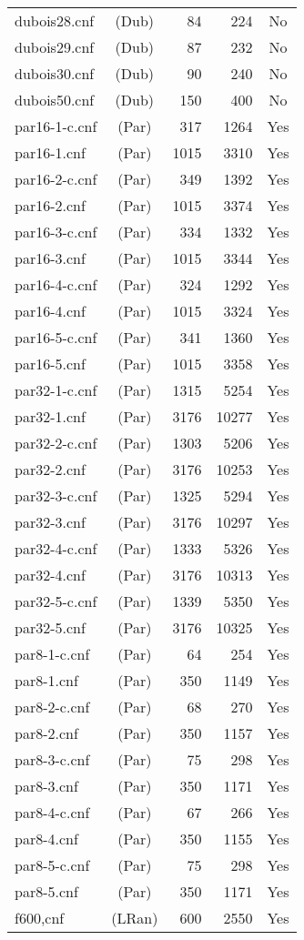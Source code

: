 \begin{supertabular}{|lc|rr|c|}
dubois28.cnf&(Dub)&84&224&No\\
dubois29.cnf&(Dub)&87&232&No\\
dubois30.cnf&(Dub)&90&240&No\\
dubois50.cnf&(Dub)&150&400&No\\
par16-1-c.cnf&(Par)&317 &1264 &Yes\\
par16-1.cnf&(Par)&1015 &3310 &Yes\\ 
par16-2-c.cnf&(Par)&349 &1392 &Yes\\
par16-2.cnf&(Par)&1015 &3374 &Yes\\ 
par16-3-c.cnf&(Par)&334 &1332 &Yes\\
par16-3.cnf&(Par)&1015 &3344 &Yes\\ 
par16-4-c.cnf&(Par)&324 &1292 &Yes\\
par16-4.cnf&(Par)&1015 &3324 &Yes\\ 
par16-5-c.cnf&(Par)&341 &1360 &Yes\\
par16-5.cnf&(Par)&1015 &3358 &Yes\\ 
par32-1-c.cnf&(Par)&1315 &5254 &Yes\\
par32-1.cnf&(Par)&3176 &10277 &Yes\\ 
par32-2-c.cnf&(Par)&1303 &5206 &Yes\\
par32-2.cnf&(Par)&3176 &10253 &Yes\\ 
par32-3-c.cnf&(Par)&1325 &5294 &Yes\\
par32-3.cnf&(Par)&3176 &10297 &Yes\\ 
par32-4-c.cnf&(Par)&1333 &5326 &Yes\\
par32-4.cnf&(Par)&3176 &10313 &Yes\\ 
par32-5-c.cnf&(Par)&1339 &5350 &Yes\\
par32-5.cnf&(Par)&3176 &10325 &Yes\\ 
par8-1-c.cnf&(Par)&64 &254 &Yes\\
par8-1.cnf&(Par)&350 &1149 &Yes\\  
par8-2-c.cnf&(Par)&68 &270 &Yes\\
par8-2.cnf&(Par)&350 &1157 &Yes\\  
par8-3-c.cnf&(Par)&75 &298 &Yes\\
par8-3.cnf&(Par)&350 &1171 &Yes\\  
par8-4-c.cnf&(Par)&67 &266 &Yes\\
par8-4.cnf&(Par)&350 &1155 &Yes\\  
par8-5-c.cnf&(Par)&75 &298 &Yes\\
par8-5.cnf&(Par)&350 &1171 &Yes\\
f600,cnf&(LRan)&600&2550&Yes\\

\end{supertabular}
